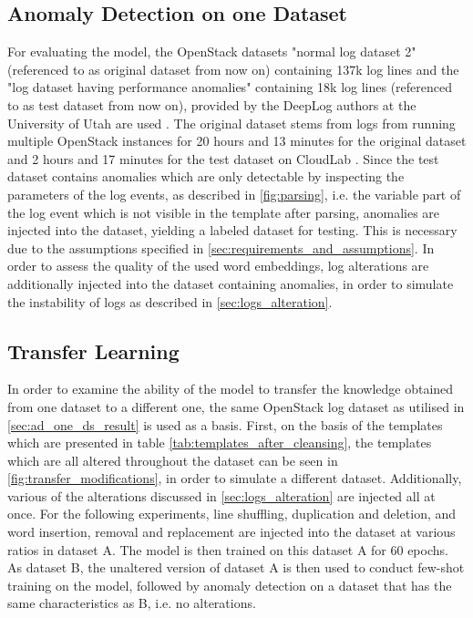\subsection{Anomaly Detection on one Dataset \label{sec:ad_one_ds_result}}
For evaluating the model, the OpenStack datasets "normal log dataset 2" (referenced to as original dataset from now on) containing 137k log lines and the "log dataset having performance anomalies" containing 18k log lines (referenced to as test dataset from now on), provided by the DeepLog authors at the University of Utah are used \cite{utah_dataset}. The original dataset stems from logs from running multiple OpenStack instances for 20 hours and 13 minutes for the original dataset and 2 hours and 17 minutes for the test dataset on CloudLab \cite{cloudlab}. Since the test dataset contains anomalies which are only detectable by inspecting the parameters of the log events, as described in \ref{fig:parsing}, i.e. the variable part of the log event which is not visible in the template after parsing, anomalies are injected into the dataset, yielding a labeled dataset for testing. This is necessary due to the assumptions specified in \ref{sec:requirements_and_assumptions}.
In order to assess the quality of the used word embeddings, log alterations are additionally injected into the dataset containing anomalies, in order to simulate the instability of logs as described in \ref{sec:logs_alteration}.


\subsection{Transfer Learning \label{sec:transfer_learning_setup}}
In order to examine the ability of the model to transfer the knowledge obtained from one dataset to a different one, the same OpenStack log dataset as utilised in \ref{sec:ad_one_ds_result} is used as a basis. First, on the basis of the templates which are presented in table \ref{tab:templates_after_cleansing}, the templates which are all altered throughout the dataset can be seen in \ref{fig:transfer_modifications}, in order to simulate a different dataset. Additionally, various of the alterations discussed in \ref{sec:logs_alteration} are injected all at once. For the following experiments, line shuffling, duplication and deletion, and word insertion, removal and replacement are injected into the dataset at various ratios in dataset A. The model is then trained on this dataset A for 60 epochs. As dataset B, the unaltered version of dataset A is then used to conduct few-shot training on the model, followed by anomaly detection on a dataset that has the same characteristics as B, i.e. no alterations.

